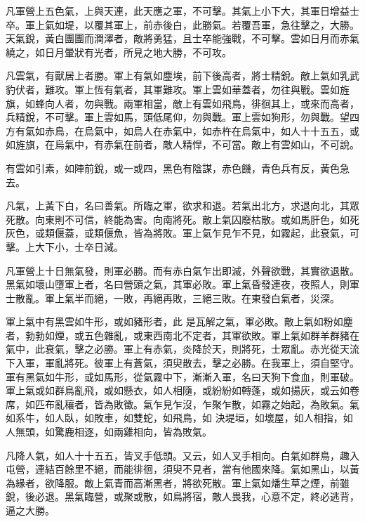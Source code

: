 \begin{pinyinscope}
 凡軍營上五色氣，上與天連，此天應之軍，不可擊。其氣上小下大，其軍日增益士卒。軍上氣如堤，以覆其軍上，前赤後白，此勝氣。若覆吾軍，急往擊之，大勝。天氣銳，黃白團團而潤澤者，敵將勇猛，且士卒能強戰，不可擊。雲如日月而赤氣繞之，如日月暈狀有光者，所見之地大勝，不可攻。



 凡雲氣，有獸居上者勝。軍上有氣如塵埃，前下後高者，將士精銳。敵上氣如乳武豹伏者，難攻。軍上恆有氣者，其軍難攻。軍上雲如華蓋者，勿往與戰。雲如旌旗，如蜂向人者，勿與戰。兩軍相當，敵上有雲如飛鳥，徘徊其上，或來而高者，兵精銳，不可擊。軍上雲如馬，頭低尾仰，勿與戰。軍上雲如狗形，勿與戰。望四方有氣如赤鳥，在烏氣中，如烏人在赤氣中，如赤杵在烏氣中，如人十十五五，或如旌旗，在烏氣中，有赤氣在前者，敵人精悍，不可當。敵上有雲如山，不可說。



 有雲如引素，如陣前銳，或一或四，黑色有陰謀，赤色饑，青色兵有反，黃色急去。



 凡氣，上黃下白，名曰善氣。所臨之軍，欲求和退。若氣出北方，求退向北，其眾死散。向東則不可信，終能為害。向南將死。敵上氣囚廢枯散。或如馬肝色，如死灰色，或類偃蓋，或類偃魚，皆為將敗。軍上氣乍見乍不見，如霧起，此衰氣，可擊。上大下小，士卒日減。



 凡軍營上十日無氣發，則軍必勝。而有赤白氣乍出即滅，外聲欲戰，其實欲退散。黑氣如壞山墮軍上者，名曰營頭之氣，其軍必敗。軍上氣昏發連夜，夜照人，則軍士散亂。軍上氣半而絕，一敗，再絕再敗，三絕三敗。在東發白氣者，災深。



 軍上氣中有黑雲如牛形，或如豬形者，此
 是瓦解之氣，軍必敗。敵上氣如粉如塵者，勃勃如煙，或五色雜亂，或東西南北不定者，其軍欲敗。軍上氣如群羊群豬在氣中，此衰氣，擊之必勝。軍上有赤氣，炎降於天，則將死，士眾亂。赤光從天流下入軍，軍亂將死。彼軍上有蒼氣，須臾散去，擊之必勝。在我軍上，須自堅守。軍有黑氣如牛形，或如馬形，從氣霧中下，漸漸入軍，名曰天狗下食血，則軍破。軍上氣或如群鳥亂飛，或如懸衣，如人相隨，或紛紛如轉蓬，或如揚灰，或云如卷席，如匹布亂穰者，皆為敗徵。氣乍見乍沒，乍聚乍散，如霧之始起，為敗氣。氣如系牛，如人臥，如敗車，如雙蛇，如飛鳥，如
 決堤垣，如壞屋，如人相指，如人無頭，如驚鹿相逐，如兩雞相向，皆為敗氣。



 凡降人氣，如人十十五五，皆叉手低頭。又云，如人叉手相向。白氣如群鳥，趣入屯營，連結百餘里不絕，而能徘徊，須臾不見者，當有他國來降。氣如黑山，以黃為緣者，欲降服。敵上氣青而高漸黑者，將欲死散。軍上氣如燔生草之煙，前雖銳，後必退。黑氣臨營，或聚或散，如鳥將宿，敵人畏我，心意不定，終必逃背，逼之大勝。




\end{pinyinscope}
